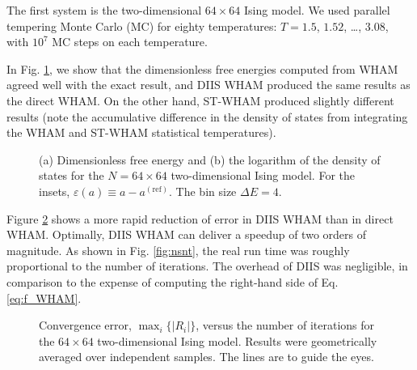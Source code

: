 \documentclass[reprint,superscriptaddress]{revtex4-1}
\begin{document}
The first system is
the two-dimensional $64\times64$ Ising model.
%
We used parallel tempering\cite{
swendsen1986, *geyer1991, *hukushima1996, *hansmann1997,
*earl2005}
Monte Carlo (MC)
for
eighty temperatures: $T = 1.5$, $1.52$, \dots, $3.08$,
with $10^7$ MC steps on each temperature.



In Fig. \ref{fig:is2ref},
we show that
the dimensionless free energies computed from WHAM
agreed well with the exact result\cite{
ferdinand1969},
and DIIS WHAM produced the same results
as the direct WHAM.
%
On the other hand,
ST-WHAM produced slightly different results
(note the accumulative difference
in the density of states
from integrating the WHAM and ST-WHAM
statistical temperatures).



\begin{figure}[h]
  \caption{
    \label{fig:is2ref}
    (a) Dimensionless free energy and
    (b) the logarithm of the density of states
    for the $N = 64\times64$ two-dimensional Ising model.
    For the insets,
    $\varepsilon(a) \equiv a - a^\mathrm{(ref)}$.
    The bin size $\Delta E = 4$.
  }
\end{figure}




Figure \ref{fig:is2trace}
shows a more rapid reduction of error
in DIIS WHAM
than in direct WHAM.
%
Optimally, DIIS WHAM can
deliver a speedup of two orders of magnitude.
%
As shown in Fig. \ref{fig:nsnt},
the real run time was roughly
proportional to the number of iterations.
The overhead of DIIS was negligible,
in comparison to the expense of computing
the right-hand side of
Eq. \eqref{eq:f_WHAM}.






\begin{figure}[h]
  \caption{
    \label{fig:is2trace}
    Convergence error, $\max_i \{ |R_i| \}$,
    versus the number of iterations
    for the $64\times64$ two-dimensional Ising model.
    Results were geometrically averaged over independent samples.
    The lines are to guide the eyes.
  }
\end{figure}
\end{document}
